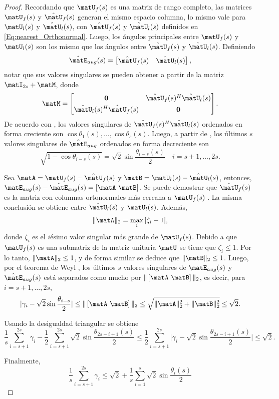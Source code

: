 \begin{proof}
	Recordando que $\matU_f(s)$ es una matriz de rango completo, las matrices $\matU_f(s)$ y $\hat{\matU}_f(s)$ generan el mismo espacio columna, lo mismo vale para $\matU_l(s)$ y $\hat{\matU}_l(s)$, con $\hat{\matU}_f(s)$ y $\hat{\matU}_l(s)$ definidos en \eqref{Eq:nearest_Orthonormal}. Luego, los ángulos principales entre $\matU_f(s)$ y $\matU_l(s)$ son los mismo que los ángulos entre $\hat{\matU}_f(s)$ y $\hat{\matU}_l(s)$. Definiendo
	\begin{equation}
		\hat{\matE}_{aug}(s) = \begin{bmatrix} \hat{\matU}_f(s) & \hat{\matU}_l(s)\end{bmatrix},
	\end{equation}
	notar que sus valores singulares se pueden obtener a partir de la matriz $\matI_{2s}+\matM$, donde
	\[\matM = \begin{bmatrix} \mathbf{0} & \hat{\matU}_f(s)^H\hat{\matU}_l(s)\\[0.3em] \hat{\matU}_l(s)^H\hat{\matU}_f(s) & \mathbf{0}
	\end{bmatrix}.\]
	De acuerdo con \cite[Teorema I.5.2]{Stewart1990}, los valores singulares de $\hat{\matU}_f(s)^H\hat{\matU}_l(s)$ ordenados en forma creciente son $\cos\theta_1(s),\ldots,\cos\theta_s(s)$. Luego, a partir de \cite[Teorema 7.3.3]{Horn1990}, los últimos $s$ valores singulares de $\hat{\matE}_{aug}$ ordenados en forma decreciente son
	\[\sqrt{1-\cos\theta_{i-s}(s)} = \sqrt{2}\sin\frac{\theta_{i-s}(s)}{2}\quad i= s+1,\ldots,2s.\]
	
	Sea $\matA = \matU_f(s) - \hat{\matU}_f(s)$ y $\matB = \matU_l(s) - \hat{\matU}_l(s)$, entonces, $\matE_{aug}(s) - \hat{\matE}_{aug}(s) = \left[ \matA\  \matB\right]$. Se puede demostrar que $\hat{\matU}_f(s)$ es la matriz con columnas ortonormales más cercana a  $\matU_f(s)$ \cite{Higham89}. La misma conclusión se obtiene entre $\hat{\matU}_l(s)$ y $\matU_l(s)$. Además,
	\[\|\matA\|_2 = \max_{i}|\zeta_i-1|,\]
	donde $\zeta_i$ es el $i$ésimo valor singular más grande de $\matU_f(s)$. Debido a que $\matU_f(s)$ es una submatriz de la matriz unitaria $\matU$ se tiene que  $\zeta_i\le 1$. Por lo tanto, $\|\matA\|_2\le 1$, y de forma similar se deduce que $\|\matB\|_2\le 1$. Luego, por el teorema de Weyl \cite[Teorema 4.11]{Horn1990}, los últimos $s$ valores singulares de $\matE_{aug}(s)$ y $\hat{\matE}_{aug}(s)$ está separados como mucho por $\|\left[ \matA\  \matB\right]\|_2$, es decir, para $i = s+1,\ldots, 2s$,
	\begin{equation}
		|\gamma_i -\sqrt{2}\sin\frac{\theta_{i-s}}{2}|\le \|\left[\matA\ \matB\right]\|_2\le \sqrt{\|\matA\|_2^2+\|\matB\|_2^2}\le \sqrt{2}.
	\end{equation}
	
	Usando la desigualdad triangular se obtiene
	\[\frac{1}{s}\sum_{i=s+1}^{2s}\gamma_i - \frac{1}{2}\sum_{i=s+1}^{2s}\sqrt{2}\sin\frac{\theta_{2s-i+1}(s)}{2} \le \frac{1}{2}\sum_{i=s+1}^{2s}\bigg|\gamma_i - \sqrt{2}\sin\frac{\theta_{2s-i+1}(s)}{2}\bigg|\le \sqrt{2}.\]
	
	Finalmente, 
	\[\frac{1}{s}\sum_{i=s+1}^{2s}\gamma_i\le\sqrt{2}+\frac{1}{s}\sum_{i=1}^s\sqrt{2}\sin\frac{\theta_i(s)}{2}\]
\end{proof}

